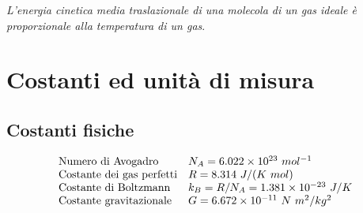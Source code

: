 \documentclass[10pt,a4paper]{book}
\begin{document}
\emph{L'energia cinetica media traslazionale di una molecola di un gas ideale è proporzionale alla temperatura di un gas}.






































































\appendix

\chapter{Costanti ed unità di misura}

\section*{Costanti fisiche}

\begin{equation*}
	\begin{array}{ l l }
		\text{Numero di Avogadro} & N_A =6.022\times 10^{23} \ mol^{-1}\\
		\text{Costante dei gas perfetti} & R=8.314\ J/( K\ mol)\\
		\text{Costante di Boltzmann} & k_B =R/N_A =1.381\times 10^{-23} \ J/K\\
		\text{Costante gravitazionale} & G=6.672\times 10^{-11} \ N\ m^2 /kg^2
	\end{array}
\end{equation*}
\end{document}
